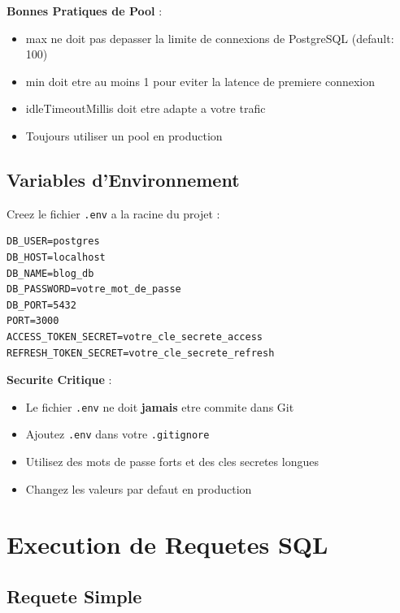 \documentclass[a4paper,12pt]{book}
\begin{document}
\begin{bestpracticebox}
    \textbf{Bonnes Pratiques de Pool} :
    \begin{itemize}
        \item max ne doit pas depasser la limite de connexions de PostgreSQL (default: 100)
        \item min doit etre au moins 1 pour eviter la latence de premiere connexion
        \item idleTimeoutMillis doit etre adapte a votre trafic
        \item Toujours utiliser un pool en production
    \end{itemize}
\end{bestpracticebox}

\subsection{Variables d'Environnement}

Creez le fichier \texttt{.env} a la racine du projet :

\begin{lstlisting}[style=bash, caption=.env - Variables d'environnement]
DB_USER=postgres
DB_HOST=localhost
DB_NAME=blog_db
DB_PASSWORD=votre_mot_de_passe
DB_PORT=5432
PORT=3000
ACCESS_TOKEN_SECRET=votre_cle_secrete_access
REFRESH_TOKEN_SECRET=votre_cle_secrete_refresh
\end{lstlisting}

\begin{warningbox}
    \textbf{Securite Critique} :
    \begin{itemize}
        \item Le fichier \texttt{.env} ne doit \textbf{jamais} etre commite dans Git
        \item Ajoutez \texttt{.env} dans votre \texttt{.gitignore}
        \item Utilisez des mots de passe forts et des cles secretes longues
        \item Changez les valeurs par defaut en production
    \end{itemize}
\end{warningbox}

\section{Execution de Requetes SQL}

\subsection{Requete Simple}
\end{document}
